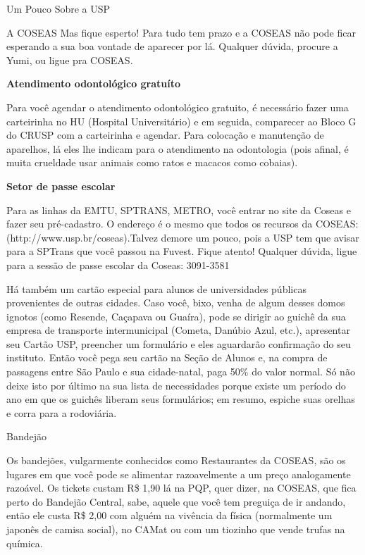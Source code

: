 \begin{secao}{Um Pouco Sobre a USP}
\begin{subsecao}{A COSEAS}
Mas fique esperto! Para tudo tem prazo e a COSEAS não pode ficar esperando a sua boa vontade de aparecer por lá. Qualquer dúvida, procure a Yumi, ou ligue pra COSEAS.

{\bf Atendimento odontológico gratuíto}

Para você agendar o atendimento odontológico gratuito, é necessário fazer uma carteirinha no HU (Hospital Universitário) e em seguida, comparecer ao Bloco G do CRUSP com a carteirinha e agendar. Para colocação e manutenção de aparelhos, lá eles lhe indicam para o atendimento na odontologia (pois afinal, é muita crueldade usar animais como ratos e macacos como cobaias). 

{\bf Setor de passe escolar}

Para as linhas da EMTU, SPTRANS, METRO, você entrar no site da Coseas e fazer seu pré-cadastro. O endereço é o mesmo que todos os recursos da COSEAS: (http://www.usp.br/coseas).Talvez demore um pouco, pois a USP tem que avisar para a SPTrans que você passou na Fuvest. Fique atento! Qualquer dúvida, ligue para a sessão de passe escolar da Coseas: 3091-3581 

Há também um cartão especial para alunos de universidades públicas provenientes de outras cidades. Caso você, bixo, venha de algum desses domos ignotos (como Resende, Caçapava ou Guaíra), pode se dirigir ao guichê da sua empresa de transporte intermunicipal (Cometa, Danúbio Azul, etc.), apresentar seu Cartão USP, preencher um formulário e eles aguardarão confirmação do seu instituto. Então você pega seu cartão na Seção de Alunos e, na compra de passagens entre São Paulo e sua cidade-natal, paga 50\% do valor normal. Só não deixe isto por último na sua lista de necessidades porque existe um período do ano em que os guichês liberam seus formulários; em resumo, espiche suas orelhas e corra para a rodoviária.

\end{subsecao}

\pagebreak


\begin{subsecao}{Bandejão}

Os bandejões, vulgarmente conhecidos como Restaurantes da COSEAS, são os lugares em que você pode se alimentar razoavelmente a um preço analogamente razoável. Os tickets custam R\$ 1,90 lá na PQP, quer dizer, na COSEAS, que fica perto do Bandejão Central, sabe, aquele que você tem preguiça de ir andando, então ele custa R\$ 2,00 com alguém na vivência da física (normalmente um japonês de camisa social), no CAMat ou com um tiozinho que vende trufas na química.


\end{subsecao}
\end{secao}
